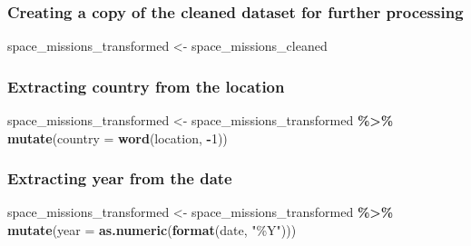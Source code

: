 \documentclass[
]{article}
\newenvironment{Shaded}{\begin{snugshade}}{\end{snugshade}}
\newcommand{\AttributeTok}[1]{\textcolor[rgb]{0.13,0.29,0.53}{#1}}
\newcommand{\DecValTok}[1]{\textcolor[rgb]{0.00,0.00,0.81}{#1}}
\newcommand{\FunctionTok}[1]{\textcolor[rgb]{0.13,0.29,0.53}{\textbf{#1}}}
\newcommand{\NormalTok}[1]{#1}
\newcommand{\OtherTok}[1]{\textcolor[rgb]{0.56,0.35,0.01}{#1}}
\newcommand{\SpecialCharTok}[1]{\textcolor[rgb]{0.81,0.36,0.00}{\textbf{#1}}}
\newcommand{\StringTok}[1]{\textcolor[rgb]{0.31,0.60,0.02}{#1}}
\begin{document}
\hypertarget{creating-a-copy-of-the-cleaned-dataset-for-further-processing}{%
\subsubsection{Creating a copy of the cleaned dataset for further
processing}\label{creating-a-copy-of-the-cleaned-dataset-for-further-processing}}

\begin{Shaded}
\begin{Highlighting}[]
\NormalTok{space\_missions\_transformed }\OtherTok{\textless{}{-}}\NormalTok{ space\_missions\_cleaned}
\end{Highlighting}
\end{Shaded}

\hypertarget{extracting-country-from-the-location}{%
\subsubsection{Extracting country from the
location}\label{extracting-country-from-the-location}}

\begin{Shaded}
\begin{Highlighting}[]
\NormalTok{space\_missions\_transformed }\OtherTok{\textless{}{-}}\NormalTok{ space\_missions\_transformed }\SpecialCharTok{\%\textgreater{}\%} 
  \FunctionTok{mutate}\NormalTok{(}\AttributeTok{country =} \FunctionTok{word}\NormalTok{(location, }\SpecialCharTok{{-}}\DecValTok{1}\NormalTok{))}
\end{Highlighting}
\end{Shaded}

\hypertarget{extracting-year-from-the-date}{%
\subsubsection{Extracting year from the
date}\label{extracting-year-from-the-date}}

\begin{Shaded}
\begin{Highlighting}[]
\NormalTok{space\_missions\_transformed }\OtherTok{\textless{}{-}}\NormalTok{ space\_missions\_transformed }\SpecialCharTok{\%\textgreater{}\%} 
  \FunctionTok{mutate}\NormalTok{(}\AttributeTok{year =} \FunctionTok{as.numeric}\NormalTok{(}\FunctionTok{format}\NormalTok{(date, }\StringTok{"\%Y"}\NormalTok{)))}
\end{Highlighting}
\end{Shaded}
\end{document}

